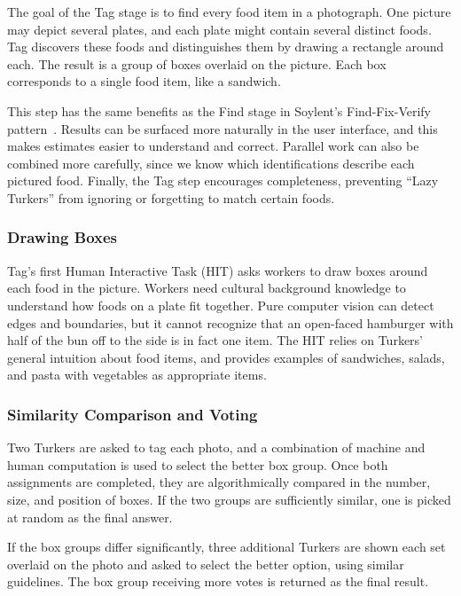 The goal of the Tag stage is to find every food item in a
photograph. One picture may depict several plates, and each plate
might contain several distinct foods. Tag discovers these foods and
distinguishes them by drawing a rectangle around each. The result is a
group of boxes overlaid on the picture. Each box corresponds to a
single food item, like a sandwich.

This step has the same benefits as the Find stage in Soylent's
Find-Fix-Verify pattern~\cite{bernstein2010soylent}. Results can be
surfaced more naturally in the user interface, and this makes
estimates easier to understand and correct. Parallel work can also be
combined more carefully, since we know which identifications describe
each pictured food. Finally, the Tag step encourages completeness,
preventing ``Lazy Turkers'' from ignoring or forgetting to match
certain foods.

\subsubsection{Drawing Boxes} 
Tag's first Human Interactive Task (HIT) asks workers to draw boxes
around each food in the picture. Workers need cultural background
knowledge to understand how foods on a plate fit together. Pure
computer vision can detect edges and boundaries, but it cannot
recognize that an open-faced hamburger with half of the bun off to the
side is in fact one item. The HIT relies on Turkers' general
intuition about food items, and provides examples of sandwiches,
salads, and pasta with vegetables as appropriate items.

\subsubsection{Similarity Comparison and Voting} 
Two Turkers are asked to tag each photo, and a combination of machine
and human computation is used to select the better box group.  Once
both assignments are completed, they are algorithmically compared in
the number, size, and position of boxes. If the two groups are
sufficiently similar, one is picked at random as the final answer.

If the box groups differ significantly, three additional Turkers are
shown each set overlaid on the photo and asked to select the better
option, using similar guidelines.  The box group receiving more votes
is returned as the final result.

